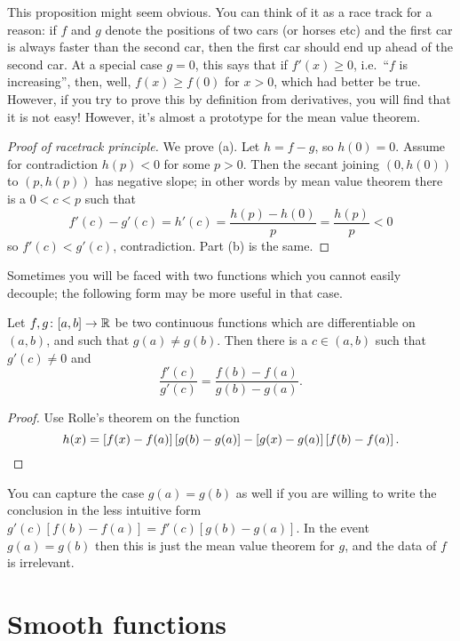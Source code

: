 This proposition might seem obvious.
You can think of it as a race track for a reason:
if $f$ and $g$ denote the positions of two cars (or horses etc)
and the first car is always faster than the second car,
then the first car should end up ahead of the second car.
At a special case $g = 0$, this says that if $f'(x) \ge 0$,
i.e.\ ``$f$ is increasing'',
then, well, $f(x) \ge f(0)$ for $x > 0$, which had better be true.
However, if you try to prove this by definition from derivatives,
you will find that it is not easy!
However, it's almost a prototype for the mean value theorem.

\begin{proof}
	[Proof of racetrack principle]
	We prove (a). Let $h = f-g$, so $h(0) = 0$.
	Assume for contradiction $h(p) < 0$ for some $p > 0$.
	Then the secant joining $(0, h(0))$ to $(p, h(p))$ has negative slope;
	in other words by mean value theorem there is a $0 < c < p$
	such that
	\[ f'(c) - g'(c) = h'(c) = \frac{h(p)-h(0)}{p} = \frac{h(p)}{p} < 0 \]
	so $f'(c) < g'(c)$, contradiction.
	Part (b) is the same.
\end{proof}

Sometimes you will be faced with two functions which you cannot
easily decouple; the following form may be more useful in that case.
\begin{theorem}
	Let $f, g \colon [a,b] \to \mathbb R$ be two continuous functions
	which are differentiable on $(a,b)$,
	and such that $g(a) \neq g(b)$.
	Then there is a $c \in (a,b)$ such that $g'(c) \neq 0$ and
	\[ \frac{f'(c)}{g'(c)} = \frac{f(b)-f(a)}{g(b)-g(a)}. \]
\end{theorem}
\begin{proof}
	Use Rolle's theorem on the function
	\[ h(x) = \left[ f(x)-f(a) \right] \left[ g(b)-g(a) \right]
		- \left[ g(x)-g(a) \right] \left[ f(b)-f(a) \right].
		\qedhere \]
\end{proof}
\begin{remark}
	You can capture the case $g(a) = g(b)$ as well
	if you are willing to write the conclusion
	in the less intuitive form $g'(c) \left[ f(b)-f(a) \right]
	= f'(c) \left[ g(b)-g(a) \right]$.
	In the event $g(a) = g(b)$ then this is just the mean value theorem
	for $g$, and the data of $f$ is irrelevant.
\end{remark}


\section{Smooth functions}

